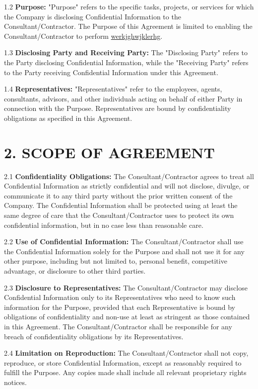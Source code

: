 \documentclass[12pt]{article}
\begin{document}
1.2 \textbf{Purpose:} "Purpose" refers to the specific tasks, projects, or services for which the Company is disclosing Confidential Information to the Consultant/Contractor. The Purpose of this Agreement is limited to enabling the Consultant/Contractor to perform \underline{werkjghwjklerhg}.

1.3 \textbf{Disclosing Party and Receiving Party:} The "Disclosing Party" refers to the Party disclosing Confidential Information, while the "Receiving Party" refers to the Party receiving Confidential Information under this Agreement.

1.4 \textbf{Representatives:} "Representatives" refer to the employees, agents, consultants, advisors, and other individuals acting on behalf of either Party in connection with the Purpose. Representatives are bound by confidentiality obligations as specified in this Agreement.

\section*{2. SCOPE OF AGREEMENT}

2.1 \textbf{Confidentiality Obligations:} The Consultant/Contractor agrees to treat all Confidential Information as strictly confidential and will not disclose, divulge, or communicate it to any third party without the prior written consent of the Company. The Confidential Information shall be protected using at least the same degree of care that the Consultant/Contractor uses to protect its own confidential information, but in no case less than reasonable care.

2.2 \textbf{Use of Confidential Information:} The Consultant/Contractor shall use the Confidential Information solely for the Purpose and shall not use it for any other purpose, including but not limited to, personal benefit, competitive advantage, or disclosure to other third parties.

2.3 \textbf{Disclosure to Representatives:} The Consultant/Contractor may disclose Confidential Information only to its Representatives who need to know such information for the Purpose, provided that each Representative is bound by obligations of confidentiality and non-use at least as stringent as those contained in this Agreement. The Consultant/Contractor shall be responsible for any breach of confidentiality obligations by its Representatives.

2.4 \textbf{Limitation on Reproduction:} The Consultant/Contractor shall not copy, reproduce, or store Confidential Information, except as reasonably required to fulfill the Purpose. Any copies made shall include all relevant proprietary rights notices.
\end{document}
